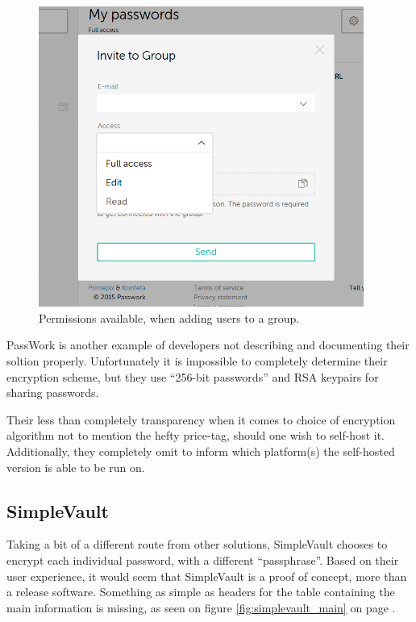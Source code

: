 			\begin{figure}[htbp]
				\centering
				\includegraphics[width=0.95\textwidth]{figures/analysis/passwork_adduser_cropped.png}
				\caption{Permissions available, when adding users to a group.}
				\label{fig:passwork_adduser}
			\end{figure}

			PassWork is another example of developers not describing and documenting their soltion properly. Unfortunately it is impossible to completely determine their encryption scheme, but they use ``256-bit passwords'' and RSA keypairs for sharing passwords. 

			Their less than completely transparency when it comes to choice of encryption algorithm not to mention the hefty price-tag, should one wish to self-host it. Additionally, they completely omit to inform which platform(s) the self-hosted version is able to be run on.

		\subsection*{SimpleVault}
			Taking a bit of a different route from other solutions, SimpleVault\cite{simplevault} chooses to encrypt each individual password, with a different ``passphrase''. Based on their user experience, it would seem that SimpleVault is a proof of concept, more than a release software. Something as simple as headers for the table containing the main information is missing, as seen on figure \ref{fig:simplevault_main} on page \pageref{fig:simplevault_main}.

